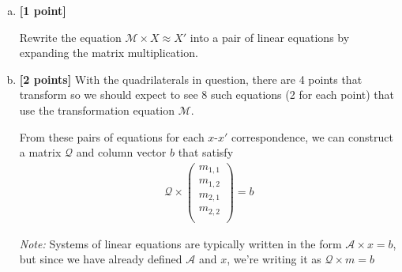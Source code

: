 \begin{enumerate}[(a)]
\item \textbf{[1 point]} 
\begin{tcolorbox}[colback=orange!5!white,colframe=orange!75!black]
Rewrite the equation $\mathcal{M} \times X \approx X'$ into a pair of linear equations by expanding the matrix multiplication.
\end{tcolorbox}


\item \textbf{[2 points]}
With the quadrilaterals in question, there are 4 points that transform so we should expect to see 8 such equations (2 for each point) that use the transformation equation $\mathcal{M}$.

From these pairs of equations for each $x$-$x'$ correspondence, we can construct a matrix $\mathcal{Q}$ and column vector $b$ that satisfy
\begin{align*}
    \mathcal{Q} \times \begin{pmatrix} m_{1,1} \\ m_{1,2} \\ m_{2,1} \\ m_{2,2} \\ \end{pmatrix} = b
\end{align*}

\emph{Note:} Systems of linear equations are typically written in the form $\mathcal{A} \times x = b$, but since we have already defined $\mathcal{A}$ and $x$, we're writing it as $\mathcal{Q} \times m = b$


\end{enumerate}
